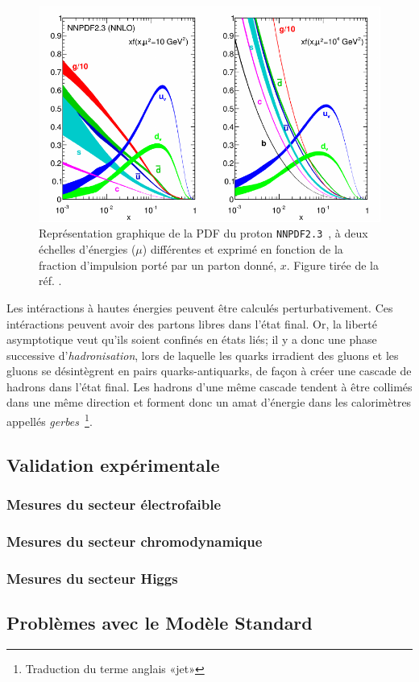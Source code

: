 \begin{figure}
  \centering
  \includegraphics{nnpdf23.pdf}
  \caption{Représentation graphique de la PDF du proton
    \texttt{NNPDF2.3}~\cite{ball_parton_2013}, à deux échelles
    d'énergies ($\mu$) différentes et exprimé en fonction de la
    fraction d'impulsion porté par un parton donné, $x$. Figure tirée de la
    réf. \cite{olive_review_2014}.}
  \label{fig:pdf}
\end{figure}

Les intéractions à hautes énergies peuvent être calculés
perturbativement. Ces intéractions peuvent avoir des partons libres
dans l'état final. Or, la liberté asymptotique veut qu'ils soient
confinés en états liés; il y a donc une phase successive
d'\emph{hadronisation}, lors de laquelle les quarks irradient des
gluons et les gluons se désintègrent en pairs quarks-antiquarks, de
façon à créer une cascade de hadrons dans l'état final. Les hadrons
d'une même cascade tendent à être collimés dans une même direction et
forment donc un amat d'énergie dans les calorimètres appellés
\emph{gerbes}~\footnote{Traduction du terme anglais «jet»}.

\subsection{Validation expérimentale}
\label{sec:ms:exp}

\subsubsection{Mesures du secteur électrofaible}
\label{sec:ms:exp:ewk}

\subsubsection{Mesures du secteur chromodynamique}
\label{sec:ms:exp:qcd}

\subsubsection{Mesures du secteur Higgs}
\label{sec:ms:exp:higgs}

\subsection{Problèmes avec le Modèle Standard}
\label{sec:ms:problemes}

